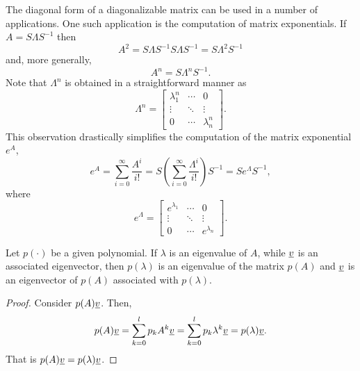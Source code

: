 The diagonal form of a diagonalizable matrix can be used in a number of applications.
One such application is the computation of matrix exponentials.
If $A = S \Lambda S^{-1}$ then
\begin{equation*}
A^2 = S \Lambda S^{-1} S \Lambda S^{-1}
= S \Lambda^2 S^{-1}
\end{equation*}
and, more generally,
\begin{equation*}
A^n = S \Lambda^n S^{-1}.
\end{equation*}
Note that $\Lambda^n$ is obtained in a straightforward manner as
\begin{equation*}
\Lambda^n = \left[ \begin{array}{ccc}
\lambda_1^n & \cdots & 0 \\
\vdots & \ddots & \vdots \\
0 & \cdots & \lambda_n^n
\end{array} \right] .
\end{equation*}
This observation drastically simplifies the computation of the matrix exponential $e^A$,
\begin{equation*}
e^A = \sum_{i=0}^{\infty} \frac{A^i}{i!}
= S \left( \sum_{i=0}^{\infty} \frac{\Lambda^i}{i!} \right) S^{-1}
= S e^{\Lambda} S^{-1},
\end{equation*}
where
\begin{equation*}
e^{\Lambda} = \left[ \begin{array}{ccc}
e^{\lambda_1} & \cdots & 0 \\
\vdots & \ddots & \vdots \\
0 & \cdots & e^{\lambda_n}
\end{array} \right] .
\end{equation*}

\begin{theorem}
Let $p( \cdot )$ be a given polynomial.
If $\lambda$ is an eigenvalue of $A$, while $\underline{v}$ is an associated eigenvector, then $p ( \lambda )$ is an eigenvalue of the matrix $p (A)$ and $\underline{v}$ is an eigenvector of $p(A)$ associated with $p(\lambda)$.
\end{theorem}
\begin{proof}
Consider $p(A) \underline{v}$.
Then,
\begin{equation*}
p( A ) \underline{v} = \sum_{k=0}^l p_k A^k \underline{v}
= \sum_{k=0}^l p_k \lambda^k \underline{v}
= p( \lambda ) \underline{v} .
\end{equation*}
That is $p(A) \underline{v} = p( \lambda ) \underline{v}$.
\end{proof}

